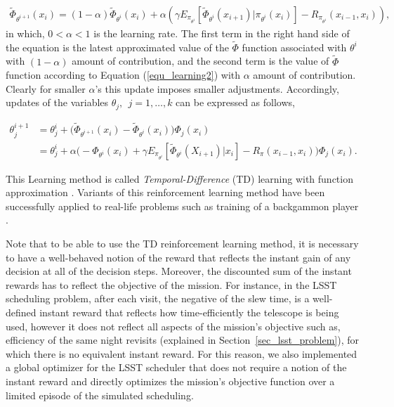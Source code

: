\documentclass[12pt]{aastex62}
\theoremstyle{definition}
\begin{document}
\begin{equation}\label{equ_updatePHI}
\begin{aligned}
\tilde \Phi_{\theta^{i+1}}(x_{{i}}) = (1-\alpha) \tilde \Phi_{\theta^{i}}(x_{{i}})+ \alpha  ( \gamma  E_{\pi_{\theta^i}}[\tilde \Phi_{\theta^{i}}(x_{{i+1}})|\pi_{\theta^{i}}(x_{{i}})] -R_{\pi_{\theta^i}}(x_{i-1},x_i) ),
\end{aligned}
\end{equation}
in which, $0<\alpha<1$ is the learning rate. The first term in the right hand side of the equation is the latest approximated value of the $\tilde \Phi$ function associated with $\theta^i$ with $(1-\alpha)$ amount of contribution, and the second term is the value of $\tilde \Phi$ function according to Equation (\ref{equ_learning2}) with $\alpha$ amount of contribution. Clearly for smaller $\alpha$'s this update imposes smaller adjustments. Accordingly, updates of the variables $\theta_j,~~j=1,\dots, k$ can be expressed as follows,

\begin{equation} \label{equ_TD_update}
\begin{aligned}
\theta_j^{i+1} &= \theta_j^{i} + \Big( \tilde \Phi_{\theta^{i+1}}(x_{{i}})  - \tilde \Phi_{\theta^{i}}(x_{{i}}) \Big)\Phi_j(x_{i})\\
& = \theta_j^{i} + \alpha \Big(-\Phi_{\theta^{i}}(x_{{i}}) + \gamma  E_{\pi_{\theta^i}}[\tilde \Phi_{\theta^{i}}(X_{{i+1}})|x_{{i}}] -R_{\pi}(x_{i-1},x_i)  \Big)\Phi_j(x_{i}).
\end{aligned}
\end{equation}

This Learning method is called \textit{Temporal-Difference} (TD) learning with function approximation \citep{tsitsiklis1997analysis}. Variants of this reinforcement learning method have been successfully applied to real-life problems such as training of a backgammon player \citep{tesauro1995temporal}.


Note that to be able to use the TD reinforcement learning method, it is necessary to have a well-behaved notion of the reward that reflects the instant gain of any decision at all of the decision steps. Moreover, the discounted sum of the instant rewards has to reflect the objective of the mission. For instance, in the LSST scheduling problem, after each visit, the negative of the slew time, is a well-defined instant reward that reflects how time-efficiently the telescope is being used, however it does not reflect all aspects of the mission's objective such as, efficiency of the same night revisits (explained in Section~\ref{sec_lsst_problem}), for which there is no equivalent instant reward. For this reason, we also implemented a global optimizer for the LSST scheduler that does not require a notion of the instant reward and directly optimizes the mission's objective function over a limited  episode of the simulated scheduling. 
\end{document}
